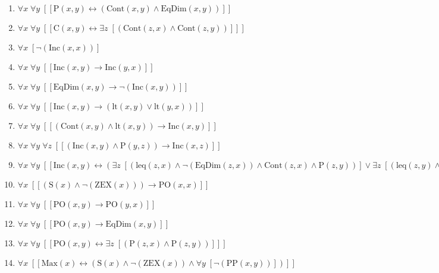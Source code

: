 \documentclass{article}
\begin{document}
\begin{enumerate}
\item $\forall x\; \forall y\;  \left[ \left[ \textrm{P}(x,y) \leftrightarrow \left(\textrm{Cont}(x,y) \land \textrm{EqDim}(x,y)\right) \right] \right]$
\item $\forall x\; \forall y\;  \left[ \left[ \textrm{C}(x,y) \leftrightarrow \exists z\;  \left[ \left(\textrm{Cont}(z,x) \land \textrm{Cont}(z,y)\right) \right] \right] \right]$
\item $\forall x\;  \left[ \neg \left(\textrm{Inc}(x,x)\right) \right]$
\item $\forall x\; \forall y\;  \left[ \left[ \textrm{Inc}(x,y) \rightarrow \textrm{Inc}(y,x) \right] \right]$
\item $\forall x\; \forall y\;  \left[ \left[ \textrm{EqDim}(x,y) \rightarrow \neg \left(\textrm{Inc}(x,y)\right) \right] \right]$
\item $\forall x\; \forall y\;  \left[ \left[ \textrm{Inc}(x,y) \rightarrow \left(\textrm{lt}(x,y) \lor \textrm{lt}(y,x)\right) \right] \right]$
\item $\forall x\; \forall y\;  \left[ \left[ \left(\textrm{Cont}(x,y) \land \textrm{lt}(x,y)\right) \rightarrow \textrm{Inc}(x,y) \right] \right]$
\item $\forall x\; \forall y\; \forall z\;  \left[ \left[ \left(\textrm{Inc}(x,y) \land \textrm{P}(y,z)\right) \rightarrow \textrm{Inc}(x,z) \right] \right]$
\item $\forall x\; \forall y\;  \left[ \left[ \textrm{Inc}(x,y) \leftrightarrow \left(\exists z\;  \left[ \left(\textrm{leq}(z,x) \land \neg \left(\textrm{EqDim}(z,x)\right) \land \textrm{Cont}(z,x) \land \textrm{P}(z,y)\right) \right] \lor \exists z\;  \left[ \left(\textrm{leq}(z,y) \land \neg \left(\textrm{EqDim}(z,y)\right) \land \textrm{Cont}(z,y) \land \textrm{P}(z,x)\right) \right]\right) \right] \right]$
\item $\forall x\;  \left[ \left[ \left(\textrm{S}(x) \land \neg \left(\textrm{ZEX}(x)\right)\right) \rightarrow \textrm{PO}(x,x) \right] \right]$
\item $\forall x\; \forall y\;  \left[ \left[ \textrm{PO}(x,y) \rightarrow \textrm{PO}(y,x) \right] \right]$
\item $\forall x\; \forall y\;  \left[ \left[ \textrm{PO}(x,y) \rightarrow \textrm{EqDim}(x,y) \right] \right]$
\item $\forall x\; \forall y\;  \left[ \left[ \textrm{PO}(x,y) \leftrightarrow \exists z\;  \left[ \left(\textrm{P}(z,x) \land \textrm{P}(z,y)\right) \right] \right] \right]$
\item $\forall x\;  \left[ \left[ \textrm{Max}(x) \leftrightarrow \left(\textrm{S}(x) \land \neg \left(\textrm{ZEX}(x)\right) \land \forall y\;  \left[ \neg \left(\textrm{PP}(x,y)\right) \right]\right) \right] \right]$

\end{enumerate}
\end{document}
